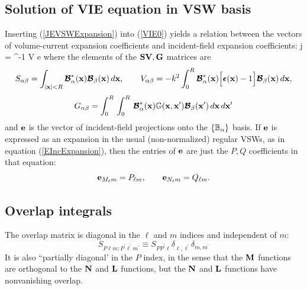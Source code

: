 \documentclass[letterpaper]{article}
\begin{document}
\subsection{Solution of VIE equation in VSW basis}

Inserting (\ref{JEVSWExpansion}) into (\ref{VIE0}) yields
a relation between the vectors of volume-current expansion
coefficients and incident-field expansion coefficients:
{
\vb j =  \Big[ \vb S + \vb V \vb G\Big]^{-1} \vb V \vb e
}
where the elements of the $\mathbf{S} \mathbf{V}, \mathbf{G}$ matrices are
$$ S_{\alpha\beta} = 
  \int_{|\mathbf{x}|<R} \boldsymbol{\mathcal{B}}_\alpha^*(\mathbf{x}) \boldsymbol{\mathcal{B}}_\beta(\mathbf{x}) \, d\mathbf{x},
\qquad
   V_{\alpha\beta} = 
   -k^2 \int_0^R \boldsymbol{\mathcal{B}}_\alpha^*(\mathbf{x})
   \Big[\boldsymbol{\epsilon}(\mathbf{x}) - 1 \Big]\boldsymbol{\mathcal{B}}_\beta(\mathbf{x})\,d\mathbf{x},
$$
$$
   G_{\alpha\beta} = 
   \int_0^R \, \int_0^R \, \boldsymbol{\mathcal{B}}_\alpha^*(\mathbf{x})
   \mathbb{G}(\mathbf{x}, \mathbf{x}^\prime)\boldsymbol{\mathcal{B}}_\beta(\mathbf{x}^\prime)\,d\mathbf{x}\,d\mathbf{x}^\prime
$$
and $\mathbf{e}$ is the vector of incident-field projections onto the
$\{\mathbb{B}_\alpha\}$ basis. If $\mathbf{e}$ is expressed as an expansion in 
the usual (non-normalized) regular VSWs, as in equation 
(\ref{EIncExpansion}), then the entries of $\mathbf{e}$ are just
the $P,Q$ coefficients in that equation:
$$ \mathbf{e}_{M_\ell m} = P_{\ell m}, 
   \qquad
   \mathbf{e}_{N_\ell m} = Q_{\ell m}.
$$

\subsection{Overlap integrals}

The overlap matrix is diagonal in the $\ell$ and $m$
indices and independent of $m$:
$$ S_{P\ell m; P^\prime \ell^\prime m^\prime} 
   \equiv S_{PP^\prime \ell}\delta_{\ell, \ell^\prime} \delta_{m,m^\prime}
$$
It is also ``partially diagonal' in the $P$ index, in the sense that the
$\mathbf{M}$ functions are orthogonal to the $\mathbf{N}$ and $\mathbf{L}$ functions,
but the $\mathbf{N}$ and $\mathbf{L}$ functions have nonvanishing overlap. 
\end{document}
